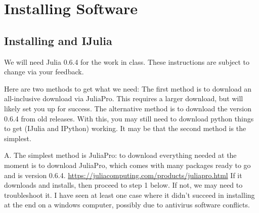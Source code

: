 
\chapter{Installing Software}

\section{Installing \protect\julia and IJulia}
We will need Julia 0.6.4 for the work in class.
These instructions are subject to change via your feedback.


Here are two methods to get what we need:  
The first method is to download an all-inclusive download via JuliaPro.   This requires a larger download, but will likely set you up for success.  The alternative method is to download the version 0.6.4 from old releases.  With this, you may still need to download python things to get \jupyter (IJulia and IPython) working.  It may be that the second method is the simplest.

A.	 The simplest method is JuliaPro:  to download everything needed at the moment is to download JuliaPro, which comes with many packages ready to go and is version 0.6.4.
\url{https://juliacomputing.com/products/juliapro.html}
If it downloads and installs, then proceed to step 1 below.  If not, we may need to troubleshoot it.  I have seen at least one case where it didn't succeed in installing at the end on a windows computer, possibly due to antivirus software conflicts.

